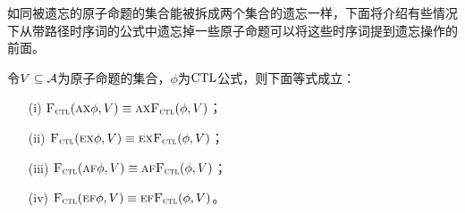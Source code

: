 如同被遗忘的原子命题的集合能被拆成两个集合的遗忘一样，下面将介绍有些情况下从带路径时序词的公式中遗忘掉一些原子命题可以将这些时序词提到遗忘操作的前面。
\begin{proposition}
	令$V\subseteq {\cal A}$为原子命题的集合，$\phi$为$\textrm{CTL}$公式，则下面等式成立：
	\begin{itemize}
		\item[(i)] ${\textsc{F}_{\textsc{ctl}}}(\textsc{a}\textsc{x}\phi,V) \equiv \textsc{a} \textsc{x}{\textsc{F}_{\textsc{ctl}}}(\phi,V)$；
		\item[(ii)] ${\textsc{F}_{\textsc{ctl}}}(\textsc{e}\textsc{x}\phi,V) \equiv \textsc{e} \textsc{x}{\textsc{F}_{\textsc{ctl}}}(\phi,V)$；
		\item[(iii)] ${\textsc{F}_{\textsc{ctl}}}(\textsc{a}\textsc{f}\phi,V) \equiv \textsc{a}\textsc{f}{\textsc{F}_{\textsc{ctl}}}(\phi,V)$；
		\item[(iv)] ${\textsc{F}_{\textsc{ctl}}}(\textsc{e}\textsc{f}\phi,V) \equiv \textsc{e}\textsc{f}{\textsc{F}_{\textsc{ctl}}}(\phi,V)$。
	\end{itemize}
\end{proposition}
